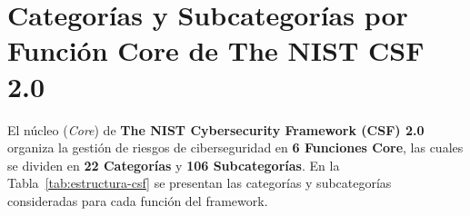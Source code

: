 \documentclass[letterpaper,11pt]{article}
\begin{document}


\newpage
{\hypersetup{linkcolor=black}\tableofcontents}

\newpage
\setcounter{page}{1}
\singlespacing

\section{Categorías y Subcategorías por Función Core de The NIST CSF 2.0}

El núcleo (\textit{Core}) de \textbf{The NIST Cybersecurity Framework (CSF) 2.0} \autocite{nist-csf-20} organiza la gestión de riesgos de ciberseguridad en \textbf{6 Funciones Core}, las cuales se dividen en \textbf{22 Categorías} y \textbf{106 Subcategorías}. En la Tabla~\ref{tab:estructura-csf} se presentan las categorías y subcategorías consideradas para cada función del framework.
\end{document}
